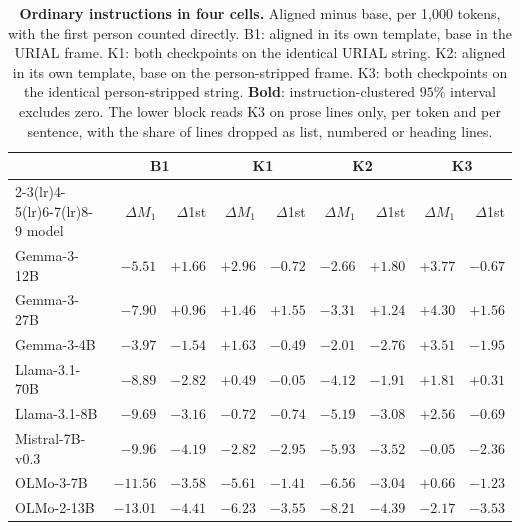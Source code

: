 \begin{table}[tb]\centering\scriptsize\setlength{\tabcolsep}{3pt}
\caption{\textbf{Ordinary instructions in four cells.} Aligned minus base, per 1,000 tokens, with the first person counted directly. B1: aligned in its own template, base in the URIAL frame. K1: both checkpoints on the identical URIAL string. K2: aligned in its own template, base on the person-stripped frame. K3: both checkpoints on the identical person-stripped string. \textbf{Bold}: instruction-clustered $95\%$ interval excludes zero. The lower block reads K3 on prose lines only, per token and per sentence, with the share of lines dropped as list, numbered or heading lines.}\label{tab:cells}
\begin{tabular}{lrrrrrrrr}\toprule
 & \multicolumn{2}{c}{B1} & \multicolumn{2}{c}{K1} & \multicolumn{2}{c}{K2} & \multicolumn{2}{c}{K3} \\
\cmidrule(lr){2-3}\cmidrule(lr){4-5}\cmidrule(lr){6-7}\cmidrule(lr){8-9}
model & $\Delta M_1$ & $\Delta$1st & $\Delta M_1$ & $\Delta$1st & $\Delta M_1$ & $\Delta$1st & $\Delta M_1$ & $\Delta$1st \\ \midrule
Gemma-3-12B & $\mathbf{-5.51}$ & $\mathbf{+1.66}$ & $\mathbf{+2.96}$ & $\mathbf{-0.72}$ & $\mathbf{-2.66}$ & $\mathbf{+1.80}$ & $\mathbf{+3.77}$ & $\mathbf{-0.67}$ \\
Gemma-3-27B & $\mathbf{-7.90}$ & $\mathbf{+0.96}$ & $\mathbf{+1.46}$ & $\mathbf{+1.55}$ & $\mathbf{-3.31}$ & $\mathbf{+1.24}$ & $\mathbf{+4.30}$ & $\mathbf{+1.56}$ \\
Gemma-3-4B & $\mathbf{-3.97}$ & $\mathbf{-1.54}$ & $\mathbf{+1.63}$ & $-0.49$ & $\mathbf{-2.01}$ & $\mathbf{-2.76}$ & $\mathbf{+3.51}$ & $\mathbf{-1.95}$ \\
Llama-3.1-70B & $\mathbf{-8.89}$ & $\mathbf{-2.82}$ & $+0.49$ & $-0.05$ & $\mathbf{-4.12}$ & $\mathbf{-1.91}$ & $\mathbf{+1.81}$ & $+0.31$ \\
Llama-3.1-8B & $\mathbf{-9.69}$ & $\mathbf{-3.16}$ & $-0.72$ & $-0.74$ & $\mathbf{-5.19}$ & $\mathbf{-3.08}$ & $\mathbf{+2.56}$ & $-0.69$ \\
Mistral-7B-v0.3 & $\mathbf{-9.96}$ & $\mathbf{-4.19}$ & $\mathbf{-2.82}$ & $\mathbf{-2.95}$ & $\mathbf{-5.93}$ & $\mathbf{-3.52}$ & $-0.05$ & $\mathbf{-2.36}$ \\
OLMo-3-7B & $\mathbf{-11.56}$ & $\mathbf{-3.58}$ & $\mathbf{-5.61}$ & $\mathbf{-1.41}$ & $\mathbf{-6.56}$ & $\mathbf{-3.04}$ & $+0.66$ & $\mathbf{-1.23}$ \\
OLMo-2-13B & $\mathbf{-13.01}$ & $\mathbf{-4.41}$ & $\mathbf{-6.23}$ & $\mathbf{-3.55}$ & $\mathbf{-8.21}$ & $\mathbf{-4.39}$ & $\mathbf{-2.17}$ & $\mathbf{-3.53}$ \\

\end{tabular}
\end{table}
